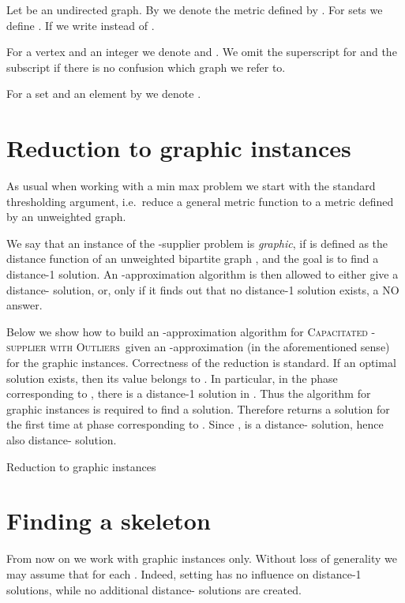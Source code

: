\documentclass{article}
\newcommand{\fullsup}{\textsc{Capacitated} -\textsc{supplier with Outliers}}
\theoremstyle{plain}
\theoremstyle{definition}
\begin{document}
Let  be an undirected graph. By  we denote the metric defined by
.
For sets  we define . If  we write  instead of .

For a vertex  and an integer  we denote
 and .
We omit the superscript for  and the subscript if there is no confusion
which graph we refer to.

For a set  and an element  by  we denote .



\section{Reduction to graphic instances}
\label{sec:thresholding}

As usual when working with a min max problem we start with the standard
thresholding argument, i.e.\ reduce a general metric function to a metric defined by an unweighted graph. 

We say that an instance of the -supplier problem is \emph{graphic},
if  is defined as the distance function of an unweighted bipartite graph
, and the goal is to find a distance-1 solution. 
An -approximation algorithm is then allowed to either give a distance-
solution, or, only if it finds out that no distance-1 solution
exists, a NO answer.

Below we show how to build an -approximation algorithm for \fullsup\ given an
-approximation (in the aforementioned sense) for the graphic instances.
Correctness of the reduction is standard. If an optimal solution exists, then
its value  belongs to . In particular, in the phase corresponding to ,
 there is a distance-1 solution in . Thus the algorithm for
graphic instances is required to find a solution. Therefore returns a
solution  for the first time at phase corresponding to .
Since ,  is a distance-
solution, hence also distance- solution.

\begin{algorithm}
\caption{Reduction to graphic instances}\label{alg:red}
\;
\;
\vspace{.2cm}
\end{algorithm} 
\section{Finding a skeleton}
\label{sec:skeleton}
From now on we work with graphic instances only.
Without loss of generality we may assume that  for each .  Indeed, setting
  has no influence on distance-1 solutions, while no
 additional distance- solutions are created.
\end{document}
